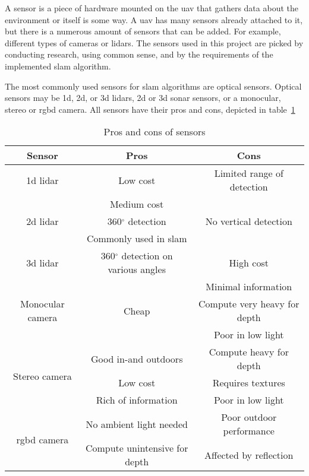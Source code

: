 A sensor is a piece of hardware mounted on the \acs{uav} that gathers data about the environment or itself is some way. A \acs{uav} has many sensors already attached to it, but there is a numerous amount of sensors that can be added. For example, different types of cameras or \acsp{lidar}. The sensors used in this project are picked by conducting research, using common sense, and by the requirements of the implemented \acs{slam} algorithm.

The most commonly used sensors for \acs{slam} algorithms are optical sensors. Optical sensors may be \acs{1d}, \acs{2d}, or \acs{3d} \acsp{lidar}, \acs{2d} or \acs{3d} sonar sensors, or a monocular, stereo or \acs{rgbd} camera. All sensors have their pros and cons, depicted in table~\ref{tab:sensors} \cite{slam_sensor_handover}

\begin{table}[!h]
  \centering
  \begin{tabular}{| c | c | c |}
    \hline
    \textbf{Sensor} & \textbf{Pros} & \textbf{Cons}\\
    \hline
    \acs{1d} \acs{lidar} & Low cost & Limited range of detection\\
    \hline
    \multirow{3}{*}{\acs{2d} \acs{lidar}} & Medium cost & \multirow{3}{*}{No vertical detection}\\
    & 360$^{\circ}$ detection &\\
    & Commonly used in \acs{slam} &\\
    \hline
    \acs{3d} \acs{lidar} & 360$^{\circ}$ detection on various angles & High cost\\
    \hline
    \multirow{3}{*}{Monocular camera} & \multirow{3}{*}{Cheap} & Minimal information\\
    & & Compute very heavy for depth\\
    & & Poor in low light\\
    \hline
    \multirow{3}{*}{Stereo camera} & Good in\hyp{}and outdoors & Compute heavy for depth\\
    & Low cost & Requires textures \\
    & Rich of information & Poor in low light \\
    \hline
    \multirow{2}{*}{\acs{rgbd} camera} & No ambient light needed & Poor outdoor performance\\
    & Compute unintensive for depth & Affected by reflection\\
    \hline
  \end{tabular}
  \caption{Pros and cons of sensors \cite{3d_camera}}
  \label{tab:sensors}
\end{table}